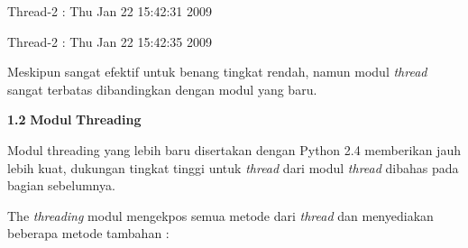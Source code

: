 \noindent 
\begin{center}{\fontsize{10pt}{10pt}\selectfont Thread-2 : Thu Jan 22 15:42:31 2009}\end{center} \par
\noindent 
\begin{center}{\fontsize{10pt}{10pt}\selectfont Thread-2 : Thu Jan 22 15:42:35 2009}\end{center} \par
\vspace{12pt}
Meskipun sangat efektif untuk benang tingkat rendah, namun modul \textit{thread} sangat terbatas dibandingkan dengan modul yang baru. \par
\vspace{12pt}
\textbf{1.2 }\textbf{Modul}\textbf{ Threading } \par
Modul threading yang lebih baru disertakan dengan Python 2.4 memberikan jauh lebih kuat, dukungan tingkat tinggi untuk \textit{thread}\textit{ }dari modul\textit{ }\textit{thread}\textit{ }dibahas pada bagian sebelumnya. \par
The \textit{thread}\textit{ing }modul mengekpos semua metode dari \textit{thread}\textit{ }dan menyediakan beberapa metode tambahan : \par
